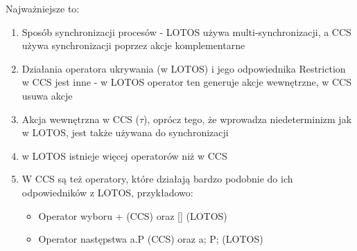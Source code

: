 \documentclass[a4paper,15pt]{article}
\begin{document}
Najważniejsze to:
\begin{enumerate}
\item Sposób synchronizacji procesów - LOTOS używa multi-synchronizacji, a CCS używa synchronizacji poprzez akcje komplementarne
\item Działania operatora ukrywania (w LOTOS) i jego odpowiednika Restriction w CCS jest inne - w LOTOS operator ten generuje akcje wewnętrzne, w CCS usuwa akcje
\item Akcja wewnętrzna w CCS ($\tau$), oprócz tego, że wprowadza niedeterminizm jak w LOTOS, jest także używana do synchronizacji 
\item w LOTOS istnieje więcej operatorów niż w CCS 
\item W CCS są też operatory, które działają bardzo podobnie do ich odpowiedników z LOTOS, przykładowo: 
\begin{itemize}
\item Operator wyboru + (CCS) oraz [] (LOTOS) 
\item Operator następstwa a.P (CCS) oraz a; P; (LOTOS)
\end{itemize}
\end{enumerate}
\end{document}
